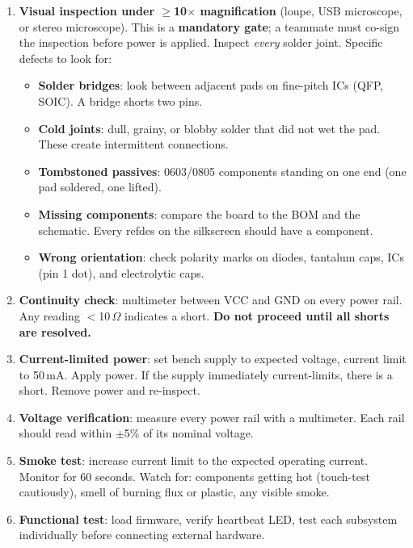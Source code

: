 \documentclass[11pt,letterpaper,twoside,openany]{book}
\begin{document}
\begin{enumerate}[leftmargin=1.5em]
\item \textbf{Visual inspection under $\geq$10$\times$ magnification} (loupe, USB microscope, or stereo microscope). This is a \textbf{mandatory gate}; a teammate must co-sign the inspection before power is applied. Inspect \emph{every} solder joint. Specific defects to look for:
\begin{itemize}[nosep,leftmargin=1.5em]
\item \textbf{Solder bridges}: look between adjacent pads on fine-pitch ICs (QFP, SOIC). A bridge shorts two pins.
\item \textbf{Cold joints}: dull, grainy, or blobby solder that did not wet the pad. These create intermittent connections.
\item \textbf{Tombstoned passives}: 0603/0805 components standing on one end (one pad soldered, one lifted).
\item \textbf{Missing components}: compare the board to the BOM and the schematic. Every refdes on the silkscreen should have a component.
\item \textbf{Wrong orientation}: check polarity marks on diodes, tantalum caps, ICs (pin 1 dot), and electrolytic caps.
\end{itemize}
\item \textbf{Continuity check}: multimeter between VCC and GND on every power rail. Any reading $<$10\,$\Omega$ indicates a short. \textbf{Do not proceed until all shorts are resolved.}
\item \textbf{Current-limited power}: set bench supply to expected voltage, current limit to 50\,mA. Apply power. If the supply immediately current-limits, there is a short. Remove power and re-inspect.
\item \textbf{Voltage verification}: measure every power rail with a multimeter. Each rail should read within $\pm$5\% of its nominal voltage.
\item \textbf{Smoke test}: increase current limit to the expected operating current. Monitor for 60 seconds. Watch for: components getting hot (touch-test cautiously), smell of burning flux or plastic, any visible smoke.
\item \textbf{Functional test}: load firmware, verify heartbeat LED, test each subsystem individually before connecting external hardware.
\end{enumerate}
\end{document}
